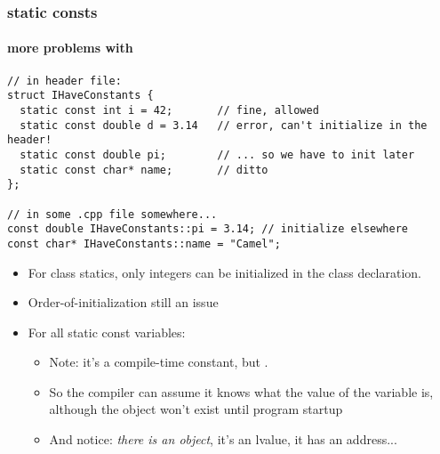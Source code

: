 \begin{frame}[fragile,t]
\frametitle{static consts}
\framesubtitle{more problems with}
{\scriptsize\begin{verbatim}
// in header file:
struct IHaveConstants {
  static const int i = 42;       // fine, allowed
  static const double d = 3.14   // error, can't initialize in the header!
  static const double pi;        // ... so we have to init later
  static const char* name;       // ditto
};

// in some .cpp file somewhere...
const double IHaveConstants::pi = 3.14; // initialize elsewhere
const char* IHaveConstants::name = "Camel";
\end{verbatim}
}
\begin{itemize}[<+->]
\item For class statics, only integers can be initialized in the class declaration.
\item Order-of-initialization still an issue
\item For all static const variables:
  \begin{itemize}
  \item Note: it's a compile-time constant, but .
  \item So the compiler can assume it knows what the value of the
    variable is, although the object won't exist until program startup
  \item And notice: \emph{there is an object}, it's an lvalue, it
    has an address...
  \end{itemize}
\end{itemize}
\pause
\begin{center}\end{center}
\end{frame}

